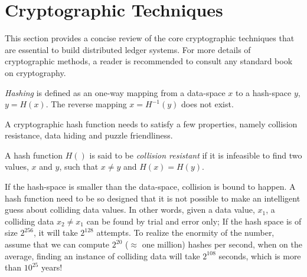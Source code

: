 \section{Cryptographic Techniques}

This section provides a concise review of the core cryptographic techniques that are essential to build distributed 
ledger systems.  For more details of cryptographic methods, a reader is recommended to consult any standard book on cryptography.


\begin{definition} [hashing]
	{\em Hashing} is defined as an one-way mapping from a data-space $x$ to a hash-space $y$, $y = H(x)$. The reverse mapping
	$x = H^{-1}(y)$ does not exist.
\end{definition}

A cryptographic hash function needs to satisfy a few properties, namely
collision resistance, data hiding and puzzle friendliness. 

\begin{definition} 
	A hash function $H()$ is said to be {\em collision resistant} if it is infeasible to find two values, 
	$x$ and $y$, such that $x \neq y$ and $H(x)= H(y)$.
\end{definition}

If the hash-space is smaller than the data-space, collision is bound to happen. A hash function need to be so designed that it is 
not possible to make an intelligent guess about colliding data values. In other words, given a data value, $x_1$, a colliding data 
$x_2 \neq x_1$ can be found by trial and error only; If the hash space is of size $2^{256}$, it will take $2^{128}$ attempts.
To realize the enormity of the number, assume that we can compute $2^{20}$ ($\approx$ one million) hashes per second, when on the 
average, finding an instance of colliding data will take $2^{108}$ seconds, which is more than $10^{25}$ years! 

